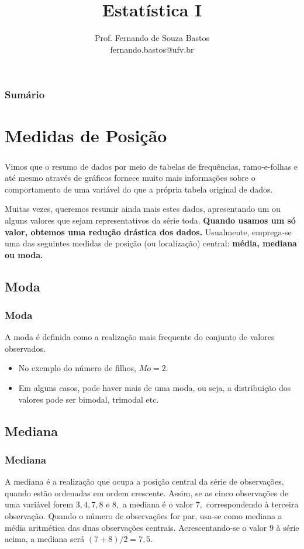 \documentclass[14pt,aspectratio=1610]{beamer}
\title{Estatística I}
\author{Prof. Fernando de Souza Bastos \texorpdfstring{\\ fernando.bastos@ufv.br}{}}
\institute{Departamento de Estatística \texorpdfstring{\\ Universidade Federal de Viçosa}{}\texorpdfstring{\\ Campus UFV - Viçosa}{}}
\date{}
\begin{document}
%

\frame{\titlepage}

\begin{frame}{}
\frametitle{\bf Sumário}
\tableofcontents
\end{frame}

\section{Medidas de Posição}
\begin{frame}{}
\frametitle{}
\begin{block}{}
\justifying
Vimos que o resumo de dados por meio de tabelas de frequências, ramo-e-folhas e até mesmo através de gráficos fornece muito mais informações sobre o comportamento de uma variável do que a própria tabela original de dados. 
\nocite{Apostila}
\end{block}
\pause
\begin{block}{}
\justifying
Muitas vezes, queremos resumir ainda mais estes dados, apresentando um ou alguns valores que sejam representativos da série toda. \textbf{Quando usamos um só valor, obtemos uma redução drástica dos dados.} Usualmente, emprega-se uma das seguintes medidas de posição (ou localização) central: \bf{média}, \bf{mediana} ou \bf{moda}.
\end{block}
\end{frame}

\subsection{Moda}
\begin{frame}{}
\frametitle{Moda}
\begin{block}{}
\justifying
A moda é definida como a realização mais frequente do conjunto de valores observados.

\begin{itemize}
\item No exemplo do número de filhos, $Mo=2.$\pause
\item Em alguns casos, pode haver 
mais de uma moda, ou seja, a distribuição dos valores pode ser bimodal, trimodal etc.
\end{itemize}
\end{block}
\end{frame}
\subsection{Mediana}
\begin{frame}{}
\frametitle{Mediana}
\begin{block}{}
\justifying
A mediana é a realização que ocupa a posição central da série de observações, quando
estão ordenadas em ordem crescente. Assim, se as cinco observações de uma variável forem $3, 4, 7, 8$ e $8,$ a mediana é o valor $7,$ correspondendo à terceira 
observação. Quando o número de observações for par, usa-se como mediana a média aritmética das duas observações centrais. Acrescentando-se o valor $9$ à série acima, a mediana será $(7 + 8)/2 = 7,5.$
\end{block}
\end{frame}
\end{document}
